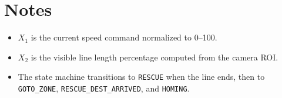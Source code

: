 \documentclass{article}
\begin{document}
\section{Notes}
\begin{itemize}
\item $X_1$ is the current speed command normalized to 0--100.
\item $X_2$ is the visible line length percentage computed from the camera ROI.
\item The state machine transitions to \texttt{RESCUE} when the line ends, then to \texttt{GOTO\_ZONE}, \texttt{RESCUE\_DEST\_ARRIVED}, and \texttt{HOMING}.
\end{itemize}
\end{document}
